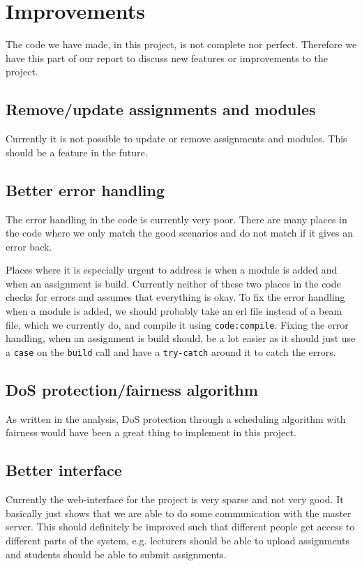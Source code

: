 \section{Improvements}
The code we have made, in this project, is not complete nor perfect. Therefore
we have this part of our report to discuss new features or improvements to the
project.

\subsection{Remove/update assignments and modules}
Currently it is not possible to update or remove assignments and modules. This
should be a feature in the future.

\subsection{Better error handling}
The error handling in the code is currently very poor. There are many places in
the code where we only match the good scenarios and do not match if it gives an
error back.

Places where it is especially urgent to address is when a module is added and
when an assignment is build. Currently neither of these two places in the code
checks for errors and assumes that everything is okay. To fix the error handling
when a module is added, we should probably take an erl file instead of a beam
file, which we currently do, and compile it using \texttt{code:compile}.
Fixing the error handling, when an assignment is build should, be a lot easier
as it should just use a \texttt{case} on the \texttt{build} call and have a
\texttt{try-catch} around it to catch the errors.

\subsection{DoS protection/fairness algorithm}
As written in the analysis, DoS protection through a scheduling algorithm with
fairness would have been a great thing to implement in this project.

\subsection{Better interface}
Currently the web-interface for the project is very sparse and not very good.
It basically just shows that we are able to do some communication with the
master server. This should definitely be improved such that different people get
access to different parts of the system, e.g. lecturers should be able to upload
assignments and students should be able to submit assignments.

